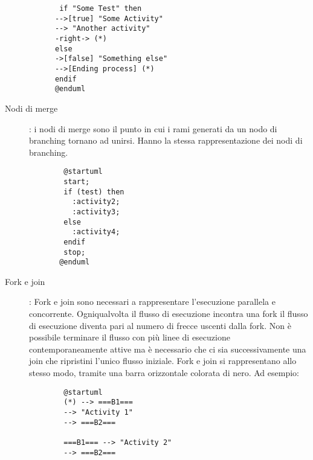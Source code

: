 \documentclass[../../norme-di-progetto.tex]{subfiles}
\begin{document}
\begin{description}
\begin{center}
\begin{verbatim}
       if "Some Test" then
      -->[true] "Some Activity"
      --> "Another activity"
      -right-> (*)
      else
      ->[false] "Something else"
      -->[Ending process] (*)
      endif
      @enduml
     \end{verbatim}
     \end{center}
     \item[Nodi di merge]: i nodi di merge sono il punto in cui i rami generati da un nodo di branching tornano ad unirsi. Hanno la stessa rappresentazione dei nodi di branching.
     \begin{center}
      \begin{verbatim}
        @startuml
        start;
        if (test) then
          :activity2;
          :activity3;
        else
          :activity4;
        endif
        stop;
       @enduml
     \end{verbatim}
    \end{center}
     \item[Fork e join]: Fork e join sono necessari a rappresentare l'esecuzione parallela e concorrente. Ogniqualvolta il flusso di esecuzione incontra una fork il flusso di esecuzione diventa pari al numero di frecce uscenti dalla fork. Non è possibile terminare il flusso con più linee di esecuzione contemporaneamente attive ma è necessario che ci sia successivamente una join che ripristini l'unico flusso iniziale. Fork e join si rappresentano allo stesso modo, tramite una barra orizzontale colorata di nero. Ad esempio:
     \begin{center}
      \begin{verbatim}
        @startuml
        (*) --> ===B1===
        --> "Activity 1"
        --> ===B2===

        ===B1=== --> "Activity 2"
        --> ===B2===


\end{verbatim}
\end{center}
\end{description}
\end{document}
